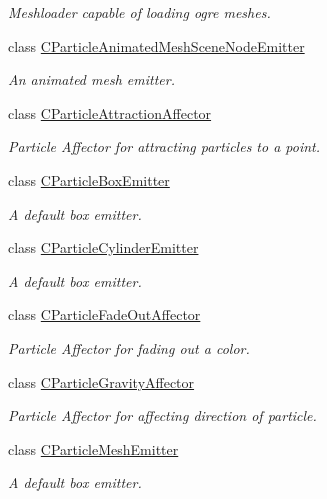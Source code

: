 \begin{DoxyCompactItemize}
\begin{DoxyCompactList}\small\item\em Meshloader capable of loading ogre meshes. \end{DoxyCompactList}\item 
class \hyperlink{classirr_1_1scene_1_1_c_particle_animated_mesh_scene_node_emitter}{C\-Particle\-Animated\-Mesh\-Scene\-Node\-Emitter}
\begin{DoxyCompactList}\small\item\em An animated mesh emitter. \end{DoxyCompactList}\item 
class \hyperlink{classirr_1_1scene_1_1_c_particle_attraction_affector}{C\-Particle\-Attraction\-Affector}
\begin{DoxyCompactList}\small\item\em Particle Affector for attracting particles to a point. \end{DoxyCompactList}\item 
class \hyperlink{classirr_1_1scene_1_1_c_particle_box_emitter}{C\-Particle\-Box\-Emitter}
\begin{DoxyCompactList}\small\item\em A default box emitter. \end{DoxyCompactList}\item 
class \hyperlink{classirr_1_1scene_1_1_c_particle_cylinder_emitter}{C\-Particle\-Cylinder\-Emitter}
\begin{DoxyCompactList}\small\item\em A default box emitter. \end{DoxyCompactList}\item 
class \hyperlink{classirr_1_1scene_1_1_c_particle_fade_out_affector}{C\-Particle\-Fade\-Out\-Affector}
\begin{DoxyCompactList}\small\item\em Particle Affector for fading out a color. \end{DoxyCompactList}\item 
class \hyperlink{classirr_1_1scene_1_1_c_particle_gravity_affector}{C\-Particle\-Gravity\-Affector}
\begin{DoxyCompactList}\small\item\em Particle Affector for affecting direction of particle. \end{DoxyCompactList}\item 
class \hyperlink{classirr_1_1scene_1_1_c_particle_mesh_emitter}{C\-Particle\-Mesh\-Emitter}
\begin{DoxyCompactList}\small\item\em A default box emitter. \end{DoxyCompactList}\item 

\end{DoxyCompactItemize}
